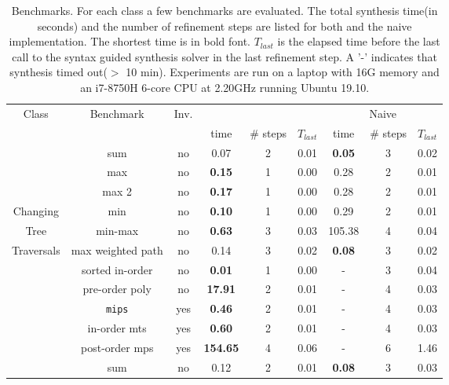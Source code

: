 \begin{table}
	\caption{Benchmarks.            For each class a few benchmarks are evaluated.
            The total synthesis time(in seconds) and the number of refinement steps are listed for both {\tool} and the naive implementation.
            The shortest time is in bold font.            $T_{last}$ is the elapsed time before the last call to the syntax guided synthesis solver in the last refinement step.
             A '-' indicates that synthesis timed out($>$ 10 min).            Experiments are run on a laptop with 16G memory and an i7-8750H 6-core CPU at 2.20GHz running Ubuntu 19.10.}\label{table:experiments}
	{
		\begin{tabular}[h]{|c|c|c|c|c|c||c|c|c|}
			\hline
			 \multirow{2}{*}{Class} & \multirow{2}{*}{Benchmark}  & \multirow{2}{*}{Inv.} & \multicolumn{3}{c||}{\tool} & \multicolumn{3}{c|}{Naive}\\ 
			\cline{4-9}
			 &   & & time & \# steps & $T_{last}$ & time & \# steps & $T_{last}$\\ 
			\hline
			 & sum & no & 0.07 & 2 & 0.01 & {\bfseries 0.05} & 3 & 0.02\\ 
			 & max & no & {\bfseries 0.15} & 1 & 0.00 & 0.28 & 2 & 0.01\\ 
			 & max 2 & no & {\bfseries 0.17} & 1 & 0.00 & 0.28 & 2 & 0.01\\ 
			Changing & min & no & {\bfseries 0.10} & 1 & 0.00 & 0.29 & 2 & 0.01\\ 
			Tree & min-max & no & {\bfseries 0.63} & 3 & 0.03 & 105.38 & 4 & 0.04\\ 
			Traversals & max weighted path & no & 0.14 & 3 & 0.02 & {\bfseries 0.08} & 3 & 0.02\\ 
			 & sorted in-order & no & {\bfseries 0.01} & 1 & 0.00 & - & 3 & 0.04\\ 
			 & pre-order poly & no & {\bfseries 17.91} & 2 & 0.01 & - & 4 & 0.03\\ 
			 & {\tt mips} & yes & {\bfseries 0.46} & 2 & 0.01 & - & 4 & 0.03\\ 
			 & in-order mts & yes & {\bfseries 0.60} & 2 & 0.01 & - & 4 & 0.03\\ 
			 & post-order mps & yes & {\bfseries 154.65} & 4 & 0.06 & - & 6 & 1.46\\ 
			\hline
			 & sum & no & 0.12 & 2 & 0.01 & {\bfseries 0.08} & 3 & 0.03\\ 

\end{tabular}}
\end{table}
